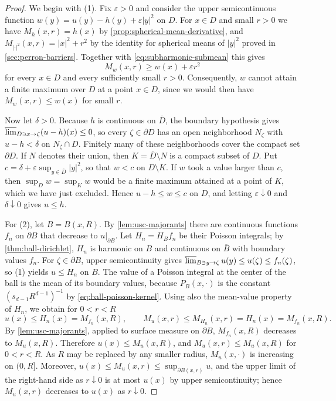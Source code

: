 \begin{proof}
We begin with (1). Fix $\varepsilon>0$ and consider the upper semicontinuous function $w(y)=u(y)-h(y)+\varepsilon|y|^2$ on $D$. For $x\in D$ and small $r>0$ we have $M_h(x,r)=h(x)$ by \cref{prop:spherical-mean-derivative}, and $M_{|\cdot|^2}(x,r)=|x|^2+r^2$ by the identity for spherical means of $|y|^2$ proved in \cref{sec:perron-barriers}. Together with \eqref{eq:subharmonic-submean} this gives
\[
 M_w(x,r)\geq w(x)+\varepsilon r^2
\]
for every $x\in D$ and every sufficiently small $r>0$. Consequently, $w$ cannot attain a finite maximum over $D$ at a point $x\in D$, since we would then have $M_w(x,r)\leq w(x)$ for small $r$.

Now let $\delta>0$. Because $h$ is continuous on $\overline D$, the boundary hypothesis gives $\varlimsup_{D\ni x\to\zeta}(u-h)(x)\leq0$, so every $\zeta\in\partial D$ has an open neighborhood $N_\zeta$ with $u-h<\delta$ on $N_\zeta\cap D$. Finitely many of these neighborhoods cover the compact set $\partial D$. If $N$ denotes their union, then $K=\overline D\setminus N$ is a compact subset of $D$. Put $c=\delta+\varepsilon\sup_{y\in\overline D}|y|^2$, so that $w<c$ on $D\setminus K$. If $w$ took a value larger than $c$, then $\sup_Dw=\sup_Kw$ would be a finite maximum attained at a point of $K$, which we have just excluded. Hence $u-h\leq w\leq c$ on $D$, and letting $\varepsilon\downarrow0$ and $\delta\downarrow0$ gives $u\leq h$.

For (2), let $B=B(x,R)$. By \cref{lem:usc-majorants} there are continuous functions $f_n$ on $\partial B$ that decrease to $u|_{\partial B}$. Let $H_n=H_Bf_n$ be their Poisson integrals; by \cref{thm:ball-dirichlet}, $H_n$ is harmonic on $B$ and continuous on $\overline B$ with boundary values $f_n$. For $\zeta\in\partial B$, upper semicontinuity gives $\varlimsup_{B\ni y\to\zeta}u(y)\leq u(\zeta)\leq f_n(\zeta)$, so (1) yields $u\leq H_n$ on $B$. The value of a Poisson integral at the center of the ball is the mean of its boundary values, because $P_B(x,\cdot)$ is the constant $(s_{d-1}R^{d-1})^{-1}$ by \eqref{eq:ball-poisson-kernel}. Using also the mean-value property of $H_n$, we obtain for $0<r<R$
\[
 u(x)\leq H_n(x)=M_{f_n}(x,R),\qquad M_u(x,r)\leq M_{H_n}(x,r)=H_n(x)=M_{f_n}(x,R).
\]
By \cref{lem:usc-majorants}, applied to surface measure on $\partial B$, $M_{f_n}(x,R)$ decreases to $M_u(x,R)$. Therefore $u(x)\leq M_u(x,R)$, and $M_u(x,r)\leq M_u(x,R)$ for $0<r<R$. As $R$ may be replaced by any smaller radius, $M_u(x,\cdot)$ is increasing on $(0,R]$. Moreover, $u(x)\leq M_u(x,r)\leq\sup_{\partial B(x,r)}u$, and the upper limit of the right-hand side as $r\downarrow0$ is at most $u(x)$ by upper semicontinuity; hence $M_u(x,r)$ decreases to $u(x)$ as $r\downarrow0$.


\end{proof}
